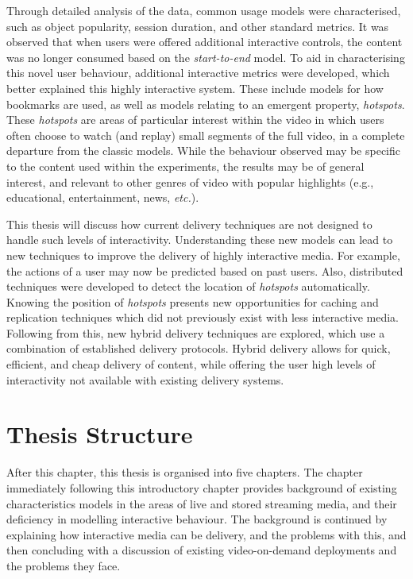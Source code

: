 Through detailed analysis of the data, common usage models were characterised, such as object popularity, session duration, and other standard metrics. It was observed that when users were offered additional interactive controls, the content was no longer consumed based on the \emph{start-to-end} model. To aid in characterising this novel user behaviour, additional interactive metrics were developed, which better explained this highly interactive system. These include models for how bookmarks are used, as well as models relating to an emergent property, \emph{hotspots}. These \emph{hotspots} are areas of particular interest within the video in which users often choose to watch (and replay) small segments of the full video, in a complete departure from the classic models. While the behaviour observed may be specific to the content used within the experiments, the results may be of general interest, and relevant to other genres of video with popular highlights (e.g., educational, entertainment, news, \emph{etc.}).

This thesis will discuss how current delivery techniques are not designed to handle such levels of interactivity. Understanding these new models can lead to new techniques to improve the delivery of highly interactive media. For example, the actions of a user may now be predicted based on past users. Also, distributed techniques were developed to detect the location of \emph{hotspots} automatically. Knowing the position of \emph{hotspots} presents new opportunities for caching and replication techniques which did not previously exist with less interactive media. Following from this, new hybrid delivery techniques are explored, which use a combination of established delivery protocols. Hybrid delivery allows for quick, efficient, and cheap delivery of content, while offering the user high levels of interactivity not available with existing delivery systems.


\section{Thesis Structure}

After this chapter, this thesis is organised into five chapters. The chapter immediately following this introductory chapter provides background of existing characteristics models in the areas of live and stored streaming media, and their deficiency in modelling interactive behaviour. The background is continued by explaining how interactive media can be delivery, and the problems with this, and then concluding with a discussion of existing video-on-demand deployments and the problems they face.

